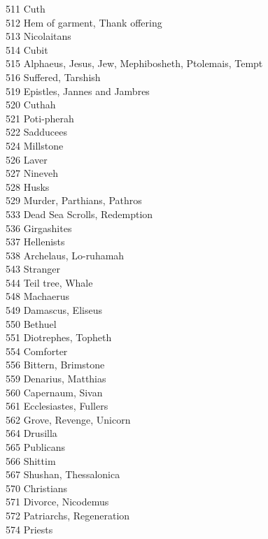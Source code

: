 511 \quad Cuth\\
512 \quad Hem of garment, Thank offering\\
513 \quad Nicolaitans\\
514 \quad Cubit\\
515 \quad Alphaeus, Jesus, Jew, Mephibosheth, Ptolemais, Tempt\\
516 \quad Suffered, Tarshish\\
519 \quad Epistles, Jannes and Jambres\\
520 \quad Cuthah\\
521 \quad Poti-pherah\\
522 \quad Sadducees\\
524 \quad Millstone\\
526 \quad Laver\\
527 \quad Nineveh\\
528 \quad Husks\\
529 \quad Murder, Parthians, Pathros\\
533 \quad Dead Sea Scrolls, Redemption\\
536 \quad Girgashites\\
537 \quad Hellenists\\
538 \quad Archelaus, Lo-ruhamah\\
543 \quad Stranger\\
544 \quad Teil tree, Whale\\
548 \quad Machaerus\\
549 \quad Damascus, Eliseus\\
550 \quad Bethuel\\
551 \quad Diotrephes, Topheth\\
554 \quad Comforter\\
556 \quad Bittern, Brimstone\\
559 \quad Denarius, Matthias\\
560 \quad Capernaum, Sivan\\
561 \quad Ecclesiastes, Fullers\\
562 \quad Grove, Revenge, Unicorn\\
564 \quad Drusilla\\
565 \quad Publicans\\
566 \quad Shittim\\
567 \quad Shushan, Thessalonica\\
570 \quad Christians\\
571 \quad Divorce, Nicodemus\\
572 \quad Patriarchs, Regeneration\\
574 \quad Priests\\
